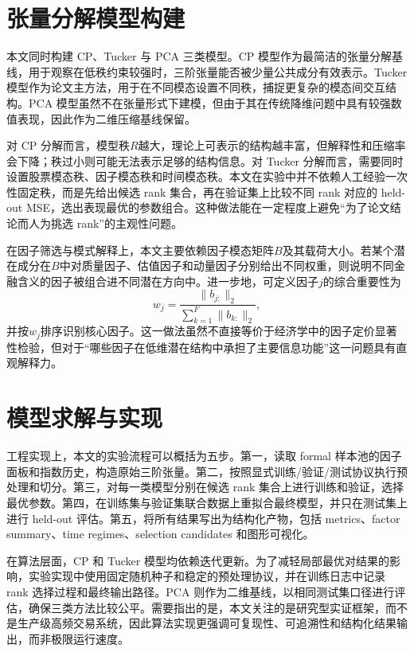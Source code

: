 \section{张量分解模型构建}

本文同时构建 CP、Tucker 与 PCA 三类模型。CP 模型作为最简洁的张量分解基线，用于观察在低秩约束较强时，三阶张量能否被少量公共成分有效表示。Tucker 模型作为论文主方法，用于在不同模态设置不同秩，捕捉更复杂的模态间交互结构。PCA 模型虽然不在张量形式下建模，但由于其在传统降维问题中具有较强数值表现，因此作为二维压缩基线保留。

对 CP 分解而言，模型秩$R$越大，理论上可表示的结构越丰富，但解释性和压缩率会下降；秩过小则可能无法表示足够的结构信息。对 Tucker 分解而言，需要同时设置股票模态秩、因子模态秩和时间模态秩。本文在实验中并不依赖人工经验一次性固定秩，而是先给出候选 rank 集合，再在验证集上比较不同 rank 对应的 held-out MSE，选出表现最优的参数组合。这种做法能在一定程度上避免“为了论文结论而人为挑选 rank”的主观性问题。

在因子筛选与模式解释上，本文主要依赖因子模态矩阵$B$及其载荷大小。若某个潜在成分在$B$中对质量因子、估值因子和动量因子分别给出不同权重，则说明不同金融含义的因子被组合进不同潜在方向中。进一步地，可定义因子$j$的综合重要性为
\begin{equation}
w_j=\frac{\|b_{j:}\|_2}{\sum_{k=1}^{F}\|b_{k:}\|_2},
\end{equation}
并按$w_j$排序识别核心因子。这一做法虽然不直接等价于经济学中的因子定价显著性检验，但对于“哪些因子在低维潜在结构中承担了主要信息功能”这一问题具有直观解释力。

\section{模型求解与实现}

工程实现上，本文的实验流程可以概括为五步。第一，读取 formal 样本池的因子面板和指数历史，构造原始三阶张量。第二，按照显式训练/验证/测试协议执行预处理和切分。第三，对每一类模型分别在候选 rank 集合上进行训练和验证，选择最优参数。第四，在训练集与验证集联合数据上重拟合最终模型，并只在测试集上进行 held-out 评估。第五，将所有结果写出为结构化产物，包括 metrics、factor summary、time regimes、selection candidates 和图形可视化。

在算法层面，CP 和 Tucker 模型均依赖迭代更新。为了减轻局部最优对结果的影响，实验实现中使用固定随机种子和稳定的预处理协议，并在训练日志中记录 rank 选择过程和最终输出路径。PCA 则作为二维基线，以相同测试集口径进行评估，确保三类方法比较公平。需要指出的是，本文关注的是研究型实证框架，而不是生产级高频交易系统，因此算法实现更强调可复现性、可追溯性和结构化结果输出，而非极限运行速度。


